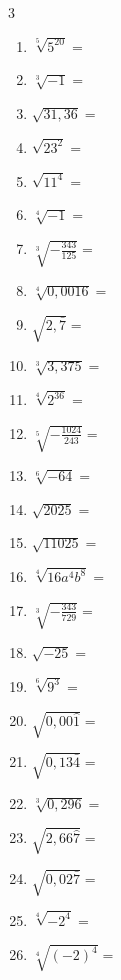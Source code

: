 \documentclass[10pt, a4paper]{article}
\begin{document}
\begin{enumerate}[start=4]
\begin{multicol}{3}
\begin{enumerate}[label=\arabic*)]
        \item $\sqrt[5]{5^{20}} =$
        \item $\sqrt[3]{-1} =$
        \item $\sqrt{31,36} =$
        \item $\sqrt{23^2} =$
        \item $\sqrt{11^4} =$
        \item $\sqrt[4]{-1} =$
        \item $\sqrt[3]{-\frac{343}{125}} =$
        \item $\sqrt[4]{0,0016} =$
        \item $\sqrt{2,\bar{7}} =$
        \item $\sqrt[3]{3,375} =$
        \item $\sqrt[4]{2^{36}} =$
        \item $\sqrt[5]{-\frac{1024}{243}} =$
        \item $\sqrt[6]{-64} =$
        \item $\sqrt{2025} =$
        \item $\sqrt{11025} =$
        \item $\sqrt[4]{16a^4 b^8} =$
        \item $\sqrt[3]{-\frac{343}{729}} =$
        \item $\sqrt{-25} =$
        \item $\sqrt[6]{9^3} =$
        \item $\sqrt{0,00\hat{1}} =$
        \item $\sqrt{0,13\bar{4}} =$
        \item $\sqrt[3]{0,296} =$
        \item $\sqrt{2,66\hat{7}} =$
        \item $\sqrt{0,02\bar{7}} =$
        \item $\sqrt[4]{-2^4} =$
        \item $\sqrt[4]{(-2)^4} =$
    \end{enumerate}
    \end{multicol}


\end{enumerate}
\end{document}
